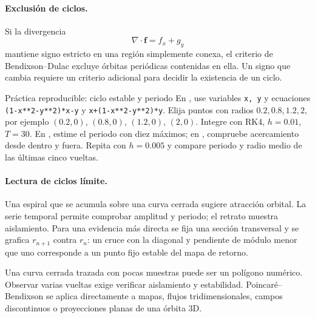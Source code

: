 \paragraph{Exclusión de ciclos.}
Si la divergencia
\[
 \nabla\cdot\mathbf f=f_x+g_y
\]
mantiene signo estricto en una región simplemente conexa, el criterio de
Bendixson--Dulac excluye órbitas periódicas contenidas en ella. Un signo que cambia
requiere un criterio adicional para decidir la existencia de un ciclo.

\begin{activitybox}{Práctica reproducible: ciclo estable y periodo}
En , use variables \texttt{x, y} y ecuaciones
\texttt{(1-x**2-y**2)*x-y} y
\texttt{x+(1-x**2-y**2)*y}. Elija puntos con radios \(0.2,0.8,1.2,2\), por ejemplo
\((0.2,0)\), \((0.8,0)\), \((1.2,0)\), \((2,0)\). Integre con RK4,
\(h=0.01\), \(T=30\). En , estime el periodo con diez máximos;
en , compruebe acercamiento desde dentro y fuera. Repita con
\(h=0.005\) y compare periodo y radio medio de las últimas cinco vueltas.
\end{activitybox}

\paragraph{Lectura de ciclos límite.}
Una espiral que se acumula sobre una curva cerrada sugiere atracción orbital. La serie
temporal permite comprobar amplitud y periodo; el retrato muestra aislamiento. Para
una evidencia más directa se fija una sección transversal y se grafica
\(r_{n+1}\) contra \(r_n\): un cruce con la diagonal y pendiente de módulo menor que
uno corresponde a un punto fijo estable del mapa de retorno.

\begin{warningbox}
Una curva cerrada trazada con pocas muestras puede ser un polígono numérico. Observar
varias vueltas exige verificar aislamiento y estabilidad. Poincaré--Bendixson se
aplica directamente a mapas, flujos tridimensionales, campos discontinuos o
proyecciones planas de una órbita 3D.
\end{warningbox}


